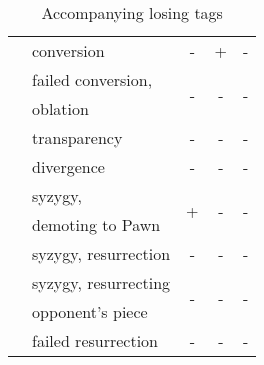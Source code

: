 \begin{table}[!h]
\begin{tabular}{ rlccc }
\alg{\%}                    & conversion            & -                    & +                     & -                     \\
\cmidrule{1-5} %
\multirow{2}{*}{\alg{\%\%}} & failed conversion,    & \multirow{2}{*}{-}   & \multirow{2}{*}{-}    & \multirow{2}{*}{-}    \\
                            & oblation              &                      &                       &                       \\
\cmidrule{1-5} %
\alg{\^{}}                  & transparency          & -                    & -                     & -                     \\
\alg{/}                     & divergence            & -                    & -                     & -                     \\
\cmidrule{1-5} %
\multirow{2}{*}{\alg{>}}    & syzygy,               & \multirow{2}{*}{+}   & \multirow{2}{*}{-}    & \multirow{2}{*}{-}    \\
                            & demoting to Pawn      &                      &                       &                       \\
\cmidrule{1-5} %
\alg{\$}                    & syzygy, resurrection  & -                    & -                     & -                     \\
\cmidrule{1-5} %
\multirow{2}{*}{\alg{\$\$}} & syzygy, resurrecting  & \multirow{2}{*}{-}   & \multirow{2}{*}{-}    & \multirow{2}{*}{-}    \\
                            & opponent's piece      &                      &                       &                       \\
\cmidrule{1-5} %
\alg{\$\$\$}                & failed resurrection   & -                    & -                     & -                     \\
\bottomrule %
\end{tabular}
\caption{Accompanying losing tags}
\label{tbl:Appendix/Summary/Accompanying-losing-tags}
\end{table}

